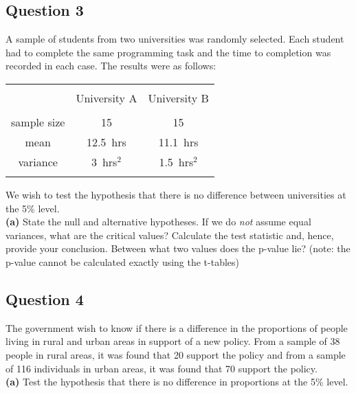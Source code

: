 
\subsection*{Question 3}
A sample of students from two universities was randomly selected. Each student had to complete the same programming task and the time to completion was recorded in each case. The results were as follows: \\[-0.2cm]

\begin{center}
\begin{tabular}{|c|c|c|}
\hline
&&\\[-0.4cm]
& University A & University B \\
\hline
&&\\[-0.4cm]
sample size & 15 & 15 \\
mean & 12.5\,\,\,hrs & 11.1\,\,\,hrs \\
variance & 3\,\,\,hrs$^2$ & 1.5\,\,\,hrs$^2$ \\
\hline
\multicolumn{3}{c}{}\\[-0.3cm]
\end{tabular}
\end{center}

We wish to test the hypothesis that there is no difference between universities at the 5\% level.\\[0.2cm]
{\bf(a)} State the null and alternative hypotheses.  If we do \emph{not} assume equal variances, what are the critical values?  Calculate the test statistic and, hence, provide your conclusion.  Between what two values does the p-value lie? (note: the p-value cannot be calculated exactly using the t-tables)



\subsection*{Question 4}
The government wish to know if there is a difference in the proportions of people living in rural and urban areas in support of a new policy. From a sample of 38 people in rural areas, it was found that 20 support the policy and from a sample of 116 individuals in urban areas, it was found that 70 support the policy. \\[-0.2cm]

{\bf(a)} Test the hypothesis that there is no difference in proportions at the 5\% level.


